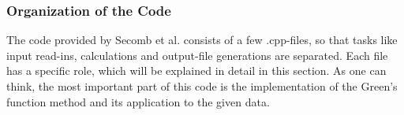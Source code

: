 \subsubsection*{Organization of the Code}

The code provided by Secomb et al. \cite{Secomb2004} consists of a few .cpp-files, so that tasks like input read-ins, calculations and output-file generations are separated. Each file has a specific role, which will be explained in detail in this section. As one can think, the most important part of this code is the implementation of the Green's function method and its application to the given data.
\\
